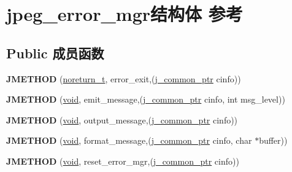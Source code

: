 \hypertarget{structjpeg__error__mgr}{}\section{jpeg\+\_\+error\+\_\+mgr结构体 参考}
\label{structjpeg__error__mgr}
\subsection*{Public 成员函数}
\begin{DoxyCompactItemize}
\item 
\mbox{\label{structjpeg__error__mgr_a72c40bceda2e6cb78046165e6892ac3a}} 
{\bfseries J\+M\+E\+T\+H\+OD} (\hyperlink{interfacevoid}{noreturn\+\_\+t}, error\+\_\+exit,(\hyperlink{structjpeg__common__struct}{j\+\_\+common\+\_\+ptr} cinfo))
\item 
\mbox{\label{structjpeg__error__mgr_a73c0a027b6e6cb8ff2b7b0fc42f756f9}} 
{\bfseries J\+M\+E\+T\+H\+OD} (\hyperlink{interfacevoid}{void}, emit\+\_\+message,(\hyperlink{structjpeg__common__struct}{j\+\_\+common\+\_\+ptr} cinfo, int msg\+\_\+level))
\item 
\mbox{\label{structjpeg__error__mgr_ac2989f8ef34acdd78ce26a9110a1c094}} 
{\bfseries J\+M\+E\+T\+H\+OD} (\hyperlink{interfacevoid}{void}, output\+\_\+message,(\hyperlink{structjpeg__common__struct}{j\+\_\+common\+\_\+ptr} cinfo))
\item 
\mbox{\label{structjpeg__error__mgr_a5f1dfb51c337c36ae1bc5fae7f84528f}} 
{\bfseries J\+M\+E\+T\+H\+OD} (\hyperlink{interfacevoid}{void}, format\+\_\+message,(\hyperlink{structjpeg__common__struct}{j\+\_\+common\+\_\+ptr} cinfo, char $\ast$buffer))
\item 
\mbox{\label{structjpeg__error__mgr_ac676478083167b3731995d7901bd4b6c}} 
{\bfseries J\+M\+E\+T\+H\+OD} (\hyperlink{interfacevoid}{void}, reset\+\_\+error\+\_\+mgr,(\hyperlink{structjpeg__common__struct}{j\+\_\+common\+\_\+ptr} cinfo))
\end{DoxyCompactItemize}
